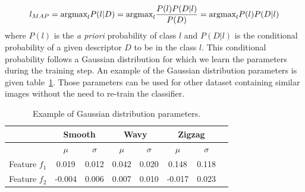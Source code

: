 \begin{equation}\label{eq:be:fine_class}
  l_{MAP} \\
  = \mbox{argmax}_{l} P(l|D) \\
  = \mbox{argmax}_{l} \frac{P(l) P(D | l)}{P(D)}\\
  = \mbox{argmax}_{l} P(l) P(D | l)
\end{equation}
where $P(l)$ is the \textit{a priori} probability of class $l$ and $P(D|l)$ is the conditional probability of a given descriptor $D$ to be in the class $l$. This conditional probability follows a Gaussian distribution for which we learn the parameters during the training step. An example of the Gaussian distribution parameters is given table~\ref{tab:in:coefficient}. Those parameters can be used for other dataset containing similar images without the need to re-train the classifier.


	\begin{table}[ht]

		\caption{Example of Gaussian distribution parameters.}
		\begin{tabular}{|c|c|c|c|c|c|c|c|}
	\hline
	  & \multicolumn{2}{|c|}{Smooth}& \multicolumn{2}{|c|}{Wavy}& \multicolumn{2}{|c|}{Zigzag}	\\
	\hline
	  & $\mu$ & $\sigma$ & $\mu$ & $\sigma$ & $\mu$ & $\sigma$ 	 	\\
	\hline
	  Feature $f_1$ & 0.019 	& 0.012 & 0.042 & 0.020 & 0.148 & 0.118   \\
	\hline
	  Feature $f_2$ & -0.004 	& 0.006 & 0.007 & 0.010 & -0.017 & 0.023   \\
	\hline
	      \end{tabular}
		\label{tab:in:coefficient}
	\end{table}%




